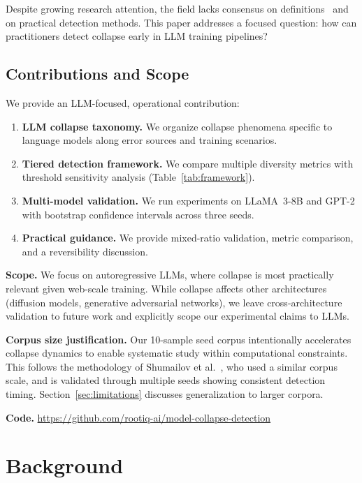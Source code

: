 \documentclass{svproc}
\begin{document}
Despite growing research attention, the field lacks consensus on
definitions~\cite{schaeffer2025position} and on practical detection methods. This
paper addresses a focused question: how can practitioners detect collapse early in
LLM training pipelines?

\subsection{Contributions and Scope}
We provide an LLM-focused, operational contribution:
\begin{enumerate}
\item \textbf{LLM collapse taxonomy.} We organize collapse phenomena specific to
language models along error sources and training scenarios.
\item \textbf{Tiered detection framework.} We compare multiple diversity metrics
with threshold sensitivity analysis (Table~\ref{tab:framework}).
\item \textbf{Multi-model validation.} We run experiments on LLaMA~3-8B and GPT-2
with bootstrap confidence intervals across three seeds.
\item \textbf{Practical guidance.} We provide mixed-ratio validation, metric
comparison, and a reversibility discussion.
\end{enumerate}

\noindent\textbf{Scope.} We focus on autoregressive LLMs, where collapse is most
practically relevant given web-scale training. While collapse affects other
architectures (diffusion models, generative adversarial networks), we leave
cross-architecture validation to future work and explicitly scope our experimental
claims to LLMs.

\noindent\textbf{Corpus size justification.} Our 10-sample seed corpus
intentionally accelerates collapse dynamics to enable systematic study within
computational constraints. This follows the methodology of Shumailov et
al.~\cite{shumailov2024nature}, who used a similar corpus scale, and is validated
through multiple seeds showing consistent detection timing.
Section~\ref{sec:limitations} discusses generalization to larger corpora.

\noindent\textbf{Code.} \url{https://github.com/rootiq-ai/model-collapse-detection}

\section{Background}\label{sec:background}
\end{document}
